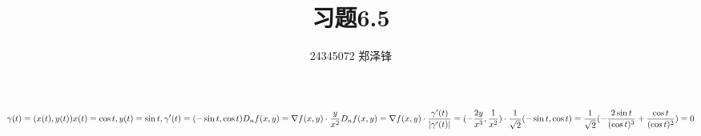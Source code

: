 \documentclass[lang=cn,a4paper,newtx]{elegantpaper}
\title{习题6.5}
\author{24345072 郑泽锋}
\begin{document}
    \begin{equation}
        \gamma (t) = (x(t), y(t))\\
        x(t) = \cos t, y(t)= \sin t, \gamma '(t) = (-\sin t, \cos t)
        D_{n}f(x,y)= \nabla f(x,y) \cdot \frac{y}{x^2}\\
        D_{n}f(x,y)= \nabla f(x,y) \cdot \frac{\gamma '(t)}{| \gamma '(t)|} = (-\frac{2y}{x^3}, \frac{1}{x^2}) \cdot \frac{1}{ \sqrt{2}}(- \sin t, \cos t) = \frac{1}{ \sqrt{2}}(- \frac{2 \sin t}{(\cos t)^3} + \frac{ \cos t}{ (\cos t)^2}) = 0
    \end{equation}
\end{document}
